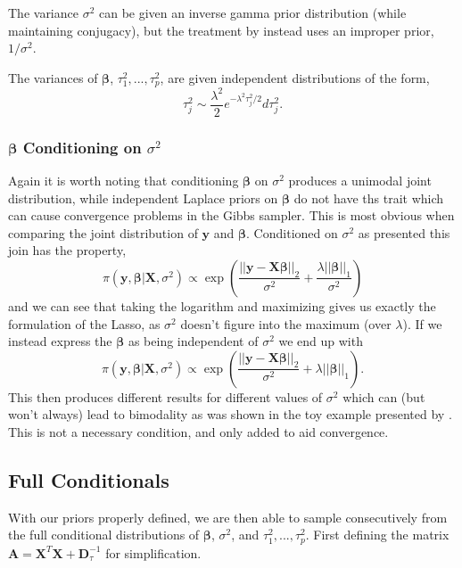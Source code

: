 \documentclass{uwstat572}
\begin{document}
The variance $\sigma^2$ can be given an inverse gamma prior distribution (while maintaining conjugacy), but the treatment by \cite{park2008bayesian} instead uses an improper prior, $1/\sigma^2$. 

The variances of $\boldsymbol\beta$, $\tau_1^2,...,\tau_p^2$, are given independent distributions of the form, \[ \tau^2_j \sim \frac{\lambda^2}{2}e^{-\lambda^2\tau^2_j/2}d\tau^2_j.\] 

\subsubsection{$\boldsymbol\beta$ Conditioning on $\sigma^2$}\label{unimodal}
Again it is worth noting that conditioning $\boldsymbol\beta$ on $\sigma^2$ produces a unimodal joint distribution, while independent Laplace priors on $\boldsymbol\beta$ do not have ths trait which can cause convergence problems in the Gibbs sampler. This is most obvious when comparing the joint distribution of $\mathbf{y}$ and $\boldsymbol\beta$. Conditioned on $\sigma^2$ as presented this join has the property, \[
\pi(\mathbf{y},\boldsymbol\beta|\mathbf{X},\sigma^2) \propto \exp{\left(\frac{||\mathbf{y}-\mathbf{X}\boldsymbol\beta||_2}{\sigma^2}+\frac{\lambda ||\boldsymbol\beta||_1}{\sigma^2}\right)}
\] and we can see that taking the logarithm and maximizing gives us exactly the formulation of the Lasso, as $\sigma^2$ doesn't figure into the maximum (over $\lambda$). If we instead express the $\boldsymbol\beta$ as being independent of $\sigma^2$ we end up with \[
\pi(\mathbf{y},\boldsymbol\beta|\mathbf{X},\sigma^2) \propto \exp{\left(\frac{||\mathbf{y}-\mathbf{X}\boldsymbol\beta||_2}{\sigma^2}+\lambda ||\boldsymbol\beta||_1\right)}.
\] This then produces different results for different values of $\sigma^2$ which can (but won't always) lead to bimodality as was shown in the toy example presented by \cite{park2008bayesian}. This is not a necessary condition, and only added to aid convergence.

\subsection{Full Conditionals}
With our priors properly defined, we are then able to sample consecutively from the full conditional distributions of $\boldsymbol\beta$, $\sigma^2$, and $\tau^2_1,...,\tau^2_p$. First defining the matrix $\mathbf{A}=\mathbf{X}^T\mathbf{X}+\mathbf{D}_\tau^{-1}$ for simplification.
\end{document}
